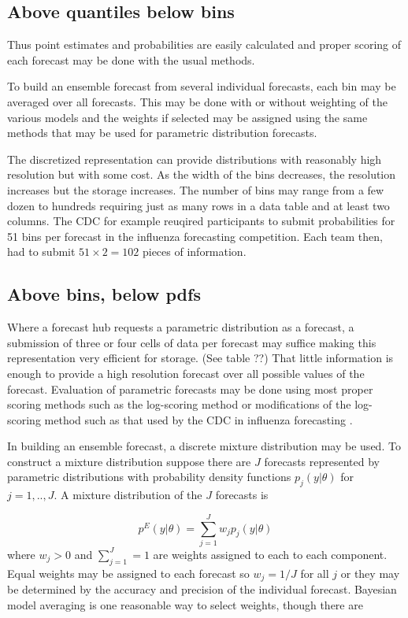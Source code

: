 \documentclass{article}\usepackage[]{graphicx}\usepackage[]{color}
\begin{document}
\subsection*{Above quantiles below bins}

Thus point estimates and
probabilities are easily calculated and proper scoring of each forecast may be 
done with the usual methods. 

To build an ensemble forecast from several individual forecasts, each bin may be
averaged over all forecasts. This may be done with or without weighting of the 
various models and the weights if selected may be assigned using the same 
methods that may be used for parametric distribution forecasts.

The discretized representation can provide distributions with reasonably high
resolution but with some cost. As the width of the bins decreases, the 
resolution increases but the storage increases. The number of bins may range 
from a few dozen to hundreds requiring just as many rows in a data table and at 
least two columns. The CDC for example reuqired participants to submit 
probabilities for 51 bins per forecast in the influenza forecasting competition. 
Each team then, had to submit $51\times2 = 102$ pieces of information.

\subsection*{Above bins, below pdfs}


Where a forecast hub requests a parametric distribution as a forecast, a 
submission of three or four cells of data per forecast may suffice making this
representation very efficient for storage. (See table ??)
That little information is enough to provide a high resolution forecast over
all possible values of the forecast. Evaluation of parametric forecasts may be 
done using most proper scoring methods such as the log-scoring method
\cite{gneiting2007strictly}
or modifications of the log-scoring method such as that used by the CDC in 
influenza forecasting \cite{reich2019collaborative}.

In building an ensemble forecast, a discrete mixture distribution may be used.  
To construct a mixture distribution suppose there are $J$ forecasts represented
by parametric distributions with probability density functions $p_j(y|\theta)$ 
for $j = 1,..,J$. A mixture distribution of the $J$ forecasts is 

$$p^{E}(y|\theta) = \sum_{j=1}^{J} w_j p_j(y|\theta)$$
where $w_j > 0$ and $\sum_{j=1}^{J} = 1$ are weights assigned to each to each 
component. Equal weights may be assigned to each forecast so $w_j = 1/J$ for all
$j$ or they may be determined by the accuracy and precision of the individual
forecast. Bayesian model averaging \cite{raftery2005using}
is one reasonable way to select weights, though there are 
\end{document}
